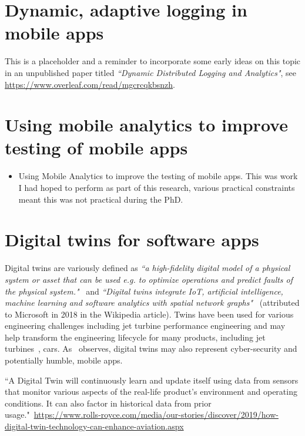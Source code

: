 \section{Dynamic, adaptive logging in mobile apps}
This is a placeholder and a reminder to incorporate some early ideas on this topic in an unpublished paper titled \emph{``Dynamic Distributed Logging and Analytics"}, see \url{https://www.overleaf.com/read/mgcrcqkbsnzh}.

\section{Using mobile analytics to improve testing of mobile apps}
\begin{itemize}
    \item Using Mobile Analytics to improve the testing of mobile apps. This was work I had hoped to perform as part of this research, various practical constraints meant this was not practical during the PhD.
\end{itemize}

\section{Digital twins for software apps}
Digital twins are variously defined as \emph{``a high-fidelity digital model of a physical system or asset that can be used e.g. to optimize operations and predict faults of the physical system."}~\cite{pokhrel2020_digitaltwin_for_cybersecurity} and \emph{``Digital twins integrate IoT, artificial intelligence, machine learning and software analytics with spatial network graphs"}~\cite{wikipedia__digital_twin} (attributed to Microsoft in 2018 in the Wikipedia article). Twins have been used for various engineering challenges including jet turbine performance engineering and may help transform the engineering lifecycle for many products, including jet turbines~\cite{read2018_digital_takeover_avionics}, cars. As~\cite{pokhrel2020_digitaltwin_for_cybersecurity} observes, digital twins may also represent cyber-security and potentially humble, mobile apps.

``A Digital Twin will continuously learn and update itself using data from sensors that monitor various aspects of the real-life product’s environment and operating conditions. It can also factor in historical data from prior usage."~\url{https://www.rolls-royce.com/media/our-stories/discover/2019/how-digital-twin-technology-can-enhance-aviation.aspx}


